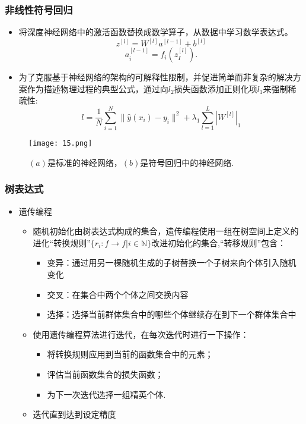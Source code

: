 \documentclass[CJK,aspectratio=169]{beamer}  %
\begin{document}
	\begin{frame}
		\frametitle{非线性符号回归}
		\begin{itemize}
			\item 将深度神经网络中的激活函数替换成数学算子，从数据中学习数学表达式。
			$$z^{[l]}=W^{[l]}a^{[l-1]}+b^{[l]}$$
			$$a_i^{[l-1]}=f_i(z_I^{[l]}).$$
			\item 为了克服基于神经网络的架构的可解释性限制，并促进简单而非复杂的解决方案作为描述物理过程的典型公式，通过向$l_2$损失函数添加正则化项$l_1$来强制稀疏性:
			$$l=\frac{1}{N}\sum_{i=1}^{N}\|\hat{y}(x_i)-y_i\|^2+\lambda_1\sum_{l=1}^{L}|W^{[l]}|_1$$
			
		\end{itemize}
	\end{frame}
	\begin{frame}
		\begin{figure}
			\centering 
			\texttt{[image: 15.png]}
			\captionsetup{font=tiny}
			\caption{$(a)$是标准的神经网络，$(b)$是符号回归中的神经网络.}
		\end{figure}
	\end{frame}
	\begin{frame}
		\frametitle{树表达式}
		\begin{itemize}
			\item 遗传编程
			\begin{itemize}
				\item 随机初始化由树表达式构成的集合，遗传编程使用一组在树空间上定义的进化“转换规则”$\{r_i: f\rightarrow f | i\in \mathbb{N}\}$改进初始化的集合,“转移规则”包含：
				\begin{itemize}
					\item 变异：通过用另一棵随机生成的子树替换一个子树来向个体引入随机变化
					\item 交叉：在集合中两个个体之间交换内容
					\item 选择：选择当前群体集合中的哪些个体继续存在到下一个群体集合中
				\end{itemize}
				\item 使用遗传编程算法进行迭代，在每次迭代时进行一下操作：
				\begin{itemize}
					\item 将转换规则应用到当前的函数集合中的元素；
					\item 评估当前函数集合的损失函数；
					\item 为下一次迭代选择一组精英个体.
				\end{itemize}
				\item 迭代直到达到设定精度
				
			\end{itemize}
		\end{itemize}
	\end{frame}
\end{document}
